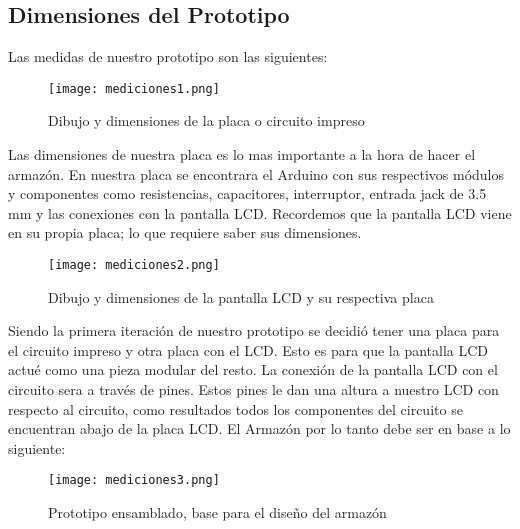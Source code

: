 \subsection{Dimensiones del Prototipo}

\par 
Las medidas de nuestro prototipo son las siguientes:

\begin{figure}[H]
	\centering
	\texttt{[image: mediciones1.png]}
	\caption{Dibujo y dimensiones de la placa o circuito impreso}
\end{figure}

\par \noindent
Las dimensiones de nuestra placa es lo mas importante a la hora de hacer el armazón. En nuestra placa se encontrara el Arduino con sus respectivos módulos y componentes como resistencias, capacitores, interruptor, entrada jack de 3.5 mm y las conexiones con la pantalla LCD. Recordemos que la pantalla LCD viene en su propia placa; lo que requiere saber sus dimensiones.

\begin{figure}[H]
	\centering
	\texttt{[image: mediciones2.png]}
	\caption{Dibujo y dimensiones de la pantalla LCD y su respectiva placa}
\end{figure}

\par \noindent
Siendo la primera iteración de nuestro prototipo se decidió tener una placa para el circuito impreso y otra placa con el LCD. Esto es para que la pantalla LCD actué como una pieza modular del resto. La conexión de la pantalla LCD con el circuito sera a través de pines. Estos pines le dan una altura a nuestro LCD con respecto al circuito, como resultados todos los componentes del circuito se encuentran abajo de la placa LCD. El Armazón por lo tanto debe ser en base a lo siguiente:

\begin{figure}[H]
	\centering
	\texttt{[image: mediciones3.png]}
	\caption{Prototipo ensamblado, base para el diseño del armazón}
\end{figure}